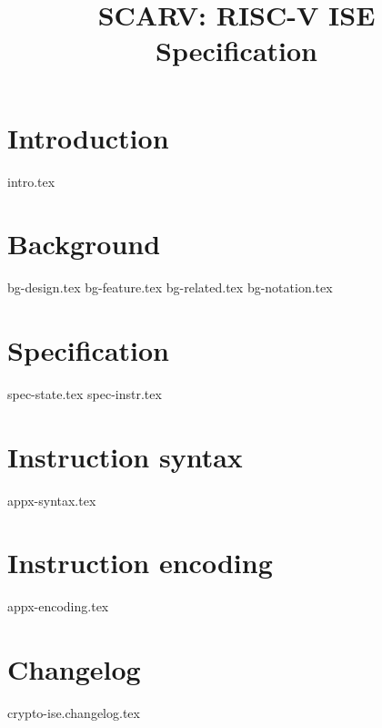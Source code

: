 \documentclass{article}
\title{SCARV: RISC-V \ISE ISE \\ Specification}
\begin{document}
\maketitle \tableofcontents


\section{Introduction}
\label{sec:intro}

{intro.tex}


\section{Background}
\label{sec:bg}

{bg-design.tex}
{bg-feature.tex}
{bg-related.tex}
{bg-notation.tex}


\section{Specification}
\label{sec:spec}

{spec-state.tex}
{spec-instr.tex}


\printbibliography


\appendix

\newpage
\section{Instruction syntax}
\label{appx:syntax}

{appx-syntax.tex}

\newpage
\section{Instruction encoding}
\label{appx:encoding}

{appx-encoding.tex}



\newpage
\section{Changelog}
{crypto-ise.changelog.tex}
\end{document}
